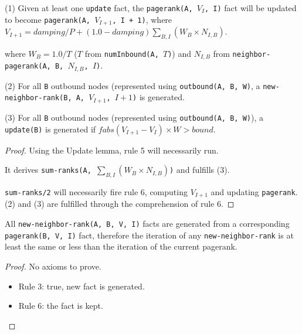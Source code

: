 \begin{lemma}
(1) Given at least one \texttt{update} fact, the \texttt{pagerank(A, $V_{I}$,
I)} fact will be updated to become \texttt{pagerank(A, $V_{I + 1}$, I +
1)}, where \texttt{$V_{I + 1} = damping / P + (1.0 - damping)\sum_{B,
I} (W_{B} \times  N_{I,B})$}.

where $W_B = 1.0/T$ ($T$ from \texttt{\bang numInbound(A, $T$)})
and $N_{I,B}$ from \texttt{neighbor-pagerank(A, B, $N_{I, B}$, $I$)}.

(2) For all \texttt{B} outbound nodes (represented using \texttt{\bang outbound(A, B,
W)}, a \texttt{new-neighbor-rank(B, A, $V_{I+1}$, $I + 1$)} is generated.

(3) For all \texttt{B} outbound nodes (represented using \texttt{\bang outbound(A, B,
W)}), a \texttt{update(B)} is generated if 
$fabs(V_{I + 1} - V_{I}) \times W > bound$.
\end{lemma}
\begin{proof}
Using the Update lemma, rule 5 will necessarily run.

It derives \texttt{sum-ranks(A, $\sum_{B, I} (W_B \times N_{I,B})$)} and
fulfills (3).

\texttt{sum-ranks/2} will necessarily fire rule 6,
computing $V_{I+1}$ and updating \texttt{pagerank}. (2) and (3) are fulfilled
through the comprehension of rule 6.
\end{proof}

\begin{invariant}
All \texttt{new-neighbor-rank(A, B, V, I)} facts are generated from a corresponding
\texttt{pagerank(B, V, I)} fact, therefore the iteration of any
\texttt{new-neighbor-rank} is at least the same or less than the iteration of
the current pagerank.
\end{invariant}
\begin{proof}
No axioms to prove.

\begin{itemize}
   \item Rule 3: true, new fact is generated.
   \item Rule 6: the fact is kept.
\end{itemize}
\end{proof}

